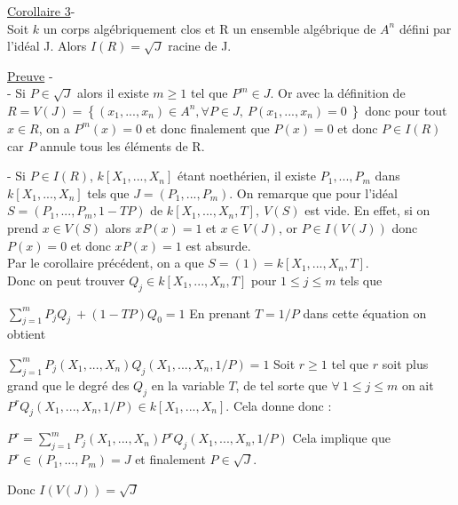 \documentclass[a4paper,10pt]{article}
\begin{document}
\underline{Corollaire 3}- \\
Soit $k$ un corps algébriquement clos et R un ensemble algébrique de $A^{n}$ défini par l'idéal J. Alors $I(R) = \sqrt{J}$ racine de J.

\underline{Preuve} -\\
- Si $ P \in \sqrt{J} $ alors il existe $m \geq 1$ tel que $ P ^{m} \in J$. Or avec la définition de $R =V(J) = \left\{  (x_{1}, ... , x_{n}) \in A^{n} , \forall P \in J , \ P(x_{1}, ... , x_{n}) = 0 \ \right\}$ donc pour tout $x \in R$, on a $P^{m}(x) = 0$ et donc finalement que $P(x) = 0$ et donc $P \in I(R)$ car $P$ annule tous les éléments de R.

- Si $P \in I(R)$, $k[X_{1},...,X_{n}] $ étant noethérien, il existe $P_{1},..., P_{m} $ dans $k[X_{1},...,X_{n}] $ tels que $J = (P_{1},..., P_{m})$. On remarque que pour l'idéal $ S = (P_{1},..., P_{m},1-TP) $ de $k[X_{1},...,X_{n},T]  ,\ V(S) $ est vide. En effet, si on prend $x \in V(S)$ alors $xP(x) = 1$ et $x \in V(J)$, or $P \in I(V(J))$ donc $P(x) = 0$ et donc $xP(x) = 1$ est absurde.\\ Par le corollaire précédent, on a que $S = (1) =k[X_{1},...,X_{n},T]$. \\
Donc on peut trouver $Q_{j} \in k[X_{1},...,X_{n},T]$ pour $1 \le j \le m$ tels que 

\centering 
$\sum_{j = 1}^m P_{j}Q_{j} \ + (1- TP)Q_{0} = 1$
\flushleft En prenant $T= 1/P$ dans cette équation on obtient

\centering $\sum_{j = 1}^m P_{j}(X_{1},...,X_{n})Q_{j}(X_{1},...,X_{n},1/P)  = 1$
\flushleft Soit $ r\geq 1$ tel que $r$ soit plus grand que le degré des $Q_{j}$ en la variable $T$, de tel sorte que $ \forall \ 1 \le j \le m$ on ait $P^{r} Q_{j}(X_{1},...,X_{n},1/P) \in k[X_{1},...,X_{n}]$. Cela donne donc :

\centering $P^{r} = \sum_{j = 1}^m P_{j}(X_{1},...,X_{n})P^{r}Q_{j}(X_{1},...,X_{n},1/P) $ 
\flushleft Cela implique que $P^{r} \in (P_{1},..., P_{m}) = J$ et finalement $P \in \sqrt{J}$.

Donc $I(V(J)) = \sqrt{J}$
\end{document}
